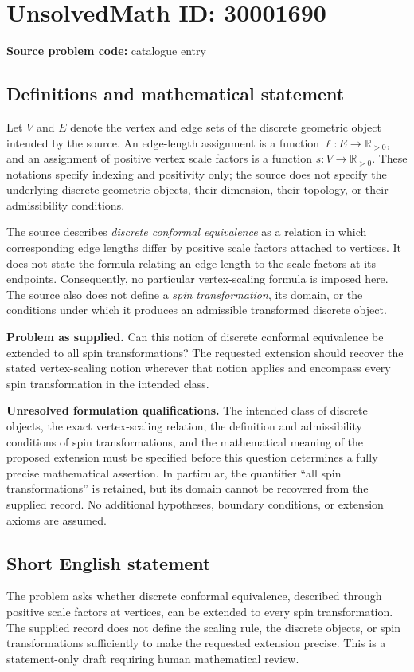 \documentclass[11pt]{article}
\newcommand{\R}{\mathbb{R}}
\begin{document}
\section*{UnsolvedMath ID: 30001690}
\textbf{Source problem code:} catalogue entry
\subsection{Definitions and mathematical statement}
Let \(V\) and \(E\) denote the vertex and edge sets of the discrete geometric object intended by the source. An edge-length assignment is a function \(\ell:E\to\R_{>0}\), and an assignment of positive vertex scale factors is a function \(s:V\to\R_{>0}\). These notations specify indexing and positivity only; the source does not specify the underlying discrete geometric objects, their dimension, their topology, or their admissibility conditions.

The source describes \emph{discrete conformal equivalence} as a relation in which corresponding edge lengths differ by positive scale factors attached to vertices. It does not state the formula relating an edge length to the scale factors at its endpoints. Consequently, no particular vertex-scaling formula is imposed here. The source also does not define a \emph{spin transformation}, its domain, or the conditions under which it produces an admissible transformed discrete object.

\textbf{Problem as supplied.} Can this notion of discrete conformal equivalence be extended to all spin transformations? The requested extension should recover the stated vertex-scaling notion wherever that notion applies and encompass every spin transformation in the intended class.

\textbf{Unresolved formulation qualifications.} The intended class of discrete objects, the exact vertex-scaling relation, the definition and admissibility conditions of spin transformations, and the mathematical meaning of the proposed extension must be specified before this question determines a fully precise mathematical assertion. In particular, the quantifier ``all spin transformations'' is retained, but its domain cannot be recovered from the supplied record. No additional hypotheses, boundary conditions, or extension axioms are assumed.
\subsection{Short English statement}
The problem asks whether discrete conformal equivalence, described through positive scale factors at vertices, can be extended to every spin transformation. The supplied record does not define the scaling rule, the discrete objects, or spin transformations sufficiently to make the requested extension precise. This is a statement-only draft requiring human mathematical review.
\end{document}
